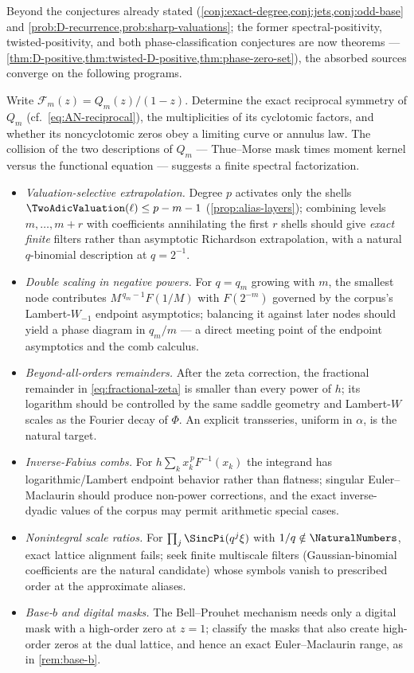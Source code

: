 \documentclass[11pt,oneside]{article}
\numberwithin{equation}{section}
\theoremstyle{definition}
\theoremstyle{remark}
\newcommand{\Frow}{\mathscr F}
\begin{document}
Beyond the conjectures already stated
(\cref{conj:exact-degree,conj:jets,conj:odd-base}
and \cref{prob:D-recurrence,prob:sharp-valuations}; the former
spectral-positivity, twisted-positivity, and both phase-classification
conjectures are now theorems ---
\cref{thm:D-positive,thm:twisted-D-positive,thm:phase-zero-set}), the
absorbed sources converge on the following programs.

\begin{problem}
\label{prob:row-geometry}
Write $\Frow_m(z)=Q_m(z)/(1-z)$.  Determine the exact reciprocal
symmetry of $Q_m$ (cf.\ \eqref{eq:AN-reciprocal}), the multiplicities
of its cyclotomic factors, and whether its noncyclotomic zeros obey a
limiting curve or annulus law.  The collision of the two descriptions
of $Q_m$ --- Thue--Morse mask times moment kernel versus the
functional equation --- suggests a finite spectral factorization.
\end{problem}

\begin{itemize}
\item\emph{Valuation-selective extrapolation.}  Degree $p$ activates
only the shells $\TwoAdicValuation(\ell)\le p-m-1$
(\cref{prop:alias-layers}); combining levels $m,\dots,m+r$ with
coefficients annihilating the first $r$ shells should give
\emph{exact finite} filters rather than asymptotic Richardson
extrapolation, with a natural $q$-binomial description at
$q=2^{-1}$.
\item\emph{Double scaling in negative powers.}  For $q=q_m$ growing
with $m$, the smallest node contributes
$M^{\,q_m-1}F(1/M)$ with $F(2^{-m})$ governed by the corpus's
Lambert-$W_{-1}$ endpoint asymptotics; balancing it against later
nodes should yield a phase diagram in $q_m/m$ --- a direct meeting
point of the endpoint asymptotics and the comb calculus.
\item\emph{Beyond-all-orders remainders.}  After the zeta correction,
the fractional remainder in \eqref{eq:fractional-zeta} is smaller
than every power of $h$; its logarithm should be controlled by the
same saddle geometry and Lambert-$W$ scales as the Fourier decay of
$\Phi$.  An explicit transseries, uniform in $\alpha$, is the
natural target.
\item\emph{Inverse-Fabius combs.}  For
$h\sum_k x_k^{\,p}F^{-1}(x_k)$ the integrand has
logarithmic/Lambert endpoint behavior rather than flatness; singular
Euler--Maclaurin should produce non-power corrections, and the exact
inverse-dyadic values of the corpus may permit arithmetic special
cases.
\item\emph{Nonintegral scale ratios.}  For
$\prod_j\SincPi(q^{j}\xi)$ with $1/q\notin\NaturalNumbers$, exact lattice
alignment fails; seek finite multiscale filters (Gaussian-binomial
coefficients are the natural candidate) whose symbols vanish to
prescribed order at the approximate aliases.
\item\emph{Base-$b$ and digital masks.}  The Bell--Prouhet mechanism
needs only a digital mask with a high-order zero at $z=1$; classify
the masks that also create high-order zeros at the dual lattice, and
hence an exact Euler--Maclaurin range, as in \cref{rem:base-b}.
\end{itemize}
\end{document}
